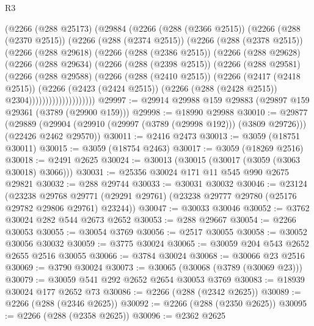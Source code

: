 \begin{lexlean}{R3}
\begin{coremodule}
          (@2266
            (@288 @25173)
            (@29884
              (@2266
                (@288 (@2366 @2515))
                (@2266
                  (@288 (@2370 @2515))
                  (@2266
                    (@288 (@2374 @2515))
                    (@2266
                      (@288 (@2378 @2515))
                      (@2266
                        (@288 @29618)
                        (@2266
                          (@288 (@2386 @2515))
                          (@2266
                            (@288 @29628)
                            (@2266
                              (@288 @29634)
                              (@2266
                                (@288 (@2398 @2515))
                                (@2266
                                  (@288 @29581)
                                  (@2266
                                    (@288 @29588)
                                    (@2266
                                      (@288 (@2410 @2515))
                                      (@2266
                                        (@2417 (@2418 @2515))
                                        (@2266
                                          (@2423 (@2424 @2515))
                                          (@2266 (@288 (@2428 @2515)) @2304))))))))))))))))))))
@29997 := @29914 @29988 @159 @29883 (@29897 @159 @29361 (@3789 (@29900 @159)))
@29998 := @18990 @29988
@30010 := @29877
    (@29889 (@29904 (@29910 (@29997 (@3789 (@29998 @192))) (@3809 @29726))) (@22426 @2462 @29570))
@30011 := @2416 @2473
@30013 := @3059 (@18751 @30011)
@30015 := @3059 (@18754 @2463)
@30017 := @3059 (@18269 @2516)
@30018 := @2491 @2625
@30024 := @30013 (@30015 (@30017 (@3059 (@3063 @30018) @3066)))
@30031 := @25356 @30024 @171 @11 @545 @990 @2675 @29821
@30032 := @288 @29744
@30033 := @30031 @30032
@30046 := @23124
    (@23238
      @29768
      @29771
      (@29291 @29761)
      (@23238 @29777 @29780 (@25176 @29782 @29806 @29761) @23244))
@30047 := @30033 @30046
@30052 := @3762 @30024 @282 @544 @2673 @2652
@30053 := @288 @29667
@30054 := @2266 @30053
@30055 := @30054 @3769
@30056 := @2517 @30055
@30058 := @30052 @30056 @30032
@30059 := @3775 @30024
@30065 := @30059 @204 @543 @2652 @2655 @2516 @30055
@30066 := @3784 @30024
@30068 := @30066 @23 @2516
@30069 := @3790 @30024
@30073 := @30065 (@30068 (@3789 (@30069 @23)))
@30079 := @30059 @541 @292 @2652 @2654 @30053 @3769
@30083 := @18939 @30024 @177 @2652 @73
@30086 := @2266 (@288 (@2342 @2625))
@30089 := @2266 (@288 (@2346 @2625))
@30092 := @2266 (@288 (@2350 @2625))
@30095 := @2266 (@288 (@2358 @2625))
@30096 := @2362 @2625

\end{coremodule}
\end{lexlean}

